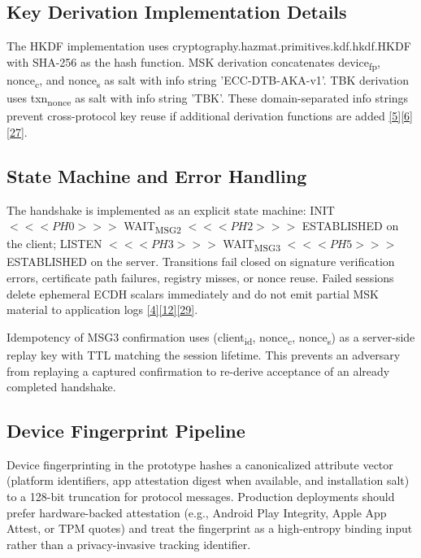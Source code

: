 \subsection{Key Derivation Implementation Details}

\indent The HKDF implementation uses cryptography.hazmat.primitives.kdf.hkdf.HKDF with SHA-256 as the hash function. MSK derivation concatenates device\textsubscript{fp}, nonce\textsubscript{c}, and nonce\textsubscript{s} as salt with info string 'ECC-DTB-AKA-v1'. TBK derivation uses txn\textsubscript{nonce} as salt with info string 'TBK'. These domain-separated info strings prevent cross-protocol key reuse if additional derivation functions are added \hyperref[ref:5]{[5]}\hyperref[ref:6]{[6]}\hyperref[ref:27]{[27]}.

\subsection{State Machine and Error Handling}

\indent The handshake is implemented as an explicit state machine: INIT $<<<PH0>>>$ WAIT\textsubscript{MSG2} $<<<PH2>>>$ ESTABLISHED on the client; LISTEN $<<<PH3>>>$ WAIT\textsubscript{MSG3} $<<<PH5>>>$ ESTABLISHED on the server. Transitions fail closed on signature verification errors, certificate path failures, registry misses, or nonce reuse. Failed sessions delete ephemeral ECDH scalars immediately and do not emit partial MSK material to application logs \hyperref[ref:4]{[4]}\hyperref[ref:12]{[12]}\hyperref[ref:29]{[29]}.

\indent Idempotency of MSG3 confirmation uses (client\textsubscript{id}, nonce\textsubscript{c}, nonce\textsubscript{s}) as a server-side replay key with TTL matching the session lifetime. This prevents an adversary from replaying a captured confirmation to re-derive acceptance of an already completed handshake.

\subsection{Device Fingerprint Pipeline}

\indent Device fingerprinting in the prototype hashes a canonicalized attribute vector (platform identifiers, app attestation digest when available, and installation salt) to a 128-bit truncation for protocol messages. Production deployments should prefer hardware-backed attestation (e.g., Android Play Integrity, Apple App Attest, or TPM quotes) and treat the fingerprint as a high-entropy binding input rather than a privacy-invasive tracking identifier.


